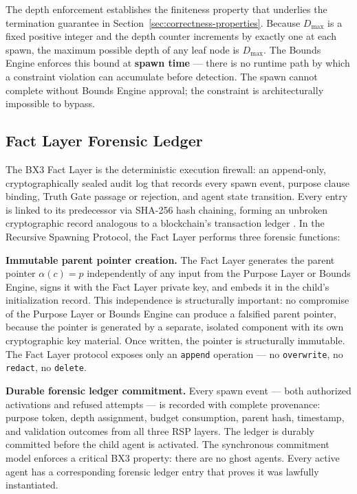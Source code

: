 The depth enforcement establishes the finiteness property that underlies the termination guarantee in Section~\ref{sec:correctness-properties}. Because $D_{\max}$ is a fixed positive integer and the depth counter increments by exactly one at each spawn, the maximum possible depth of any leaf node is $D_{\max}$. The Bounds Engine enforces this bound at \textbf{spawn time} --- there is no runtime path by which a constraint violation can accumulate before detection. The spawn cannot complete without Bounds Engine approval; the constraint is architecturally impossible to bypass.

\subsection{Fact Layer Forensic Ledger}

The BX3 Fact Layer is the deterministic execution firewall: an append-only, cryptographically sealed audit log that records every spawn event, purpose clause binding, Truth Gate passage or rejection, and agent state transition. Every entry is linked to its predecessor via SHA-256 hash chaining, forming an unbroken cryptographic record analogous to a blockchain's transaction ledger \cite{nakamoto2008bitcoin,laurie2013certificate}. In the Recursive Spawning Protocol, the Fact Layer performs three forensic functions:

\textbf{Immutable parent pointer creation.} The Fact Layer generates the parent pointer $\alpha(c) = p$ independently of any input from the Purpose Layer or Bounds Engine, signs it with the Fact Layer private key, and embeds it in the child's initialization record. This independence is structurally important: no compromise of the Purpose Layer or Bounds Engine can produce a falsified parent pointer, because the pointer is generated by a separate, isolated component with its own cryptographic key material. Once written, the pointer is structurally immutable. The Fact Layer protocol exposes only an \texttt{append} operation --- no \texttt{overwrite}, no \texttt{redact}, no \texttt{delete}.

\textbf{Durable forensic ledger commitment.} Every spawn event --- both authorized activations and refused attempts --- is recorded with complete provenance: purpose token, depth assignment, budget consumption, parent hash, timestamp, and validation outcomes from all three RSP layers. The ledger is durably committed before the child agent is activated. The synchronous commitment model enforces a critical BX3 property: there are no ghost agents. Every active agent has a corresponding forensic ledger entry that proves it was lawfully instantiated.

